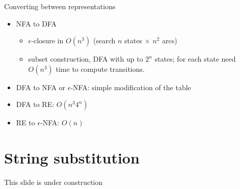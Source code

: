 \documentclass[handout]{beamer}
\begin{document}
\begin{frame}{Converting between representations}

    \begin{center}
    \end{center}
        
    \begin{itemize}
        \item NFA to DFA
        \begin{itemize}
            \item $\epsilon$-closure in $O(n^3)$ (search $n$ states $\times$ $n^2$ arcs)
            \item subset construction, DFA with up to $2^n$ states; for each state need $O(n^3)$ time to compute transitions.
        \end{itemize}        
        \item DFA to NFA or $\epsilon$-NFA: simple modification of the table        
        \item DFA to RE:  $O(n^3 4^n)$        
        \item RE to $\epsilon$-NFA: $O(n)$        
    \end{itemize}

\end{frame}


\section*{String substitution}


\begin{frame}{This slide is under construction}
    

\end{frame}
\end{document}
